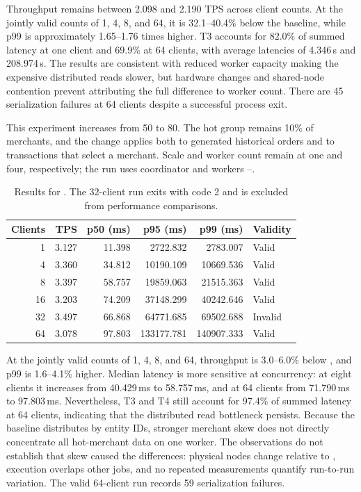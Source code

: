 Throughput remains between 2.098 and 2.190 TPS across client counts.
At the jointly valid counts of 1, 4, 8, and 64, it is
32.1--40.4\% below the baseline, while p99 is approximately
1.65--1.76 times higher.
T3 accounts for 82.0\% of summed latency at one client and 69.9\%
at 64 clients, with average latencies of 4.346\,s and 208.974\,s.
The results are consistent with reduced worker capacity making the
expensive distributed reads slower, but hardware changes and shared-node
contention prevent attributing the full difference to worker count.
There are 45 serialization failures at 64 clients despite a successful
process exit.


This experiment increases  from 50 to 80.
The hot group remains 10\% of merchants, and the change applies both
to generated historical orders and to transactions that select a
merchant. Scale and worker count remain at one and four, respectively;
the run uses coordinator  and workers
--.

\begin{table}[htbp]
  \centering
  \begin{tabular}{@{}rrrrrl@{}}
    \toprule
    Clients & TPS & p50 (ms) & p95 (ms) & p99 (ms) & Validity \\
    \midrule
     1 & 3.127 & 11.398 &   2722.832 &   2783.007 & Valid \\
     4 & 3.360 & 34.812 &  10190.109 &  10669.536 & Valid \\
     8 & 3.397 & 58.757 &  19859.063 &  21515.363 & Valid \\
    16 & 3.203 & 74.209 &  37148.299 &  40242.646 & Valid \\
    32 & 3.497 & 66.868 &  64771.685 &  69502.688 & Invalid \\
    64 & 3.078 & 97.803 & 133177.781 & 140907.333 & Valid \\
    \bottomrule
  \end{tabular}
  \caption{Results for . The 32-client run exits with code 2
  and is excluded from performance comparisons.}
  \label{tab:a0-2-results}
\end{table}

At the jointly valid counts of 1, 4, 8, and 64, throughput is
3.0--6.0\% below , and p99 is 1.6--4.1\% higher.
Median latency is more sensitive at concurrency: at eight clients it
increases from 40.429\,ms to 58.757\,ms, and at 64 clients from
71.790\,ms to 97.803\,ms.
Nevertheless, T3 and T4 still account for 97.4\% of summed latency
at 64 clients, indicating that the distributed read bottleneck persists.
Because the baseline distributes by entity IDs, stronger merchant skew
does not directly concentrate all hot-merchant data on one worker.
The observations do not establish that skew caused the differences:
physical nodes change relative to , execution overlaps other
jobs, and no repeated measurements quantify run-to-run variation.
The valid 64-client run records 59 serialization failures.

